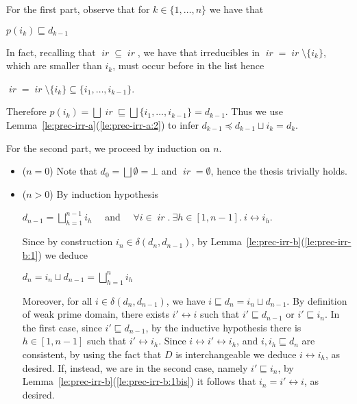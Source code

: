 \documentclass[conference]{IEEEtran}
\renewenvironment{proof}{\begin{IEEEproof}}{\end{IEEEproof}}
\newcommand{\wi}{{interchangeable}}
\newcommand{\ir}[1]{\ensuremath{\mathop{\mathit{ir}({#1})}}}
\newcommand{\diff}[2]{\ensuremath{\delta({#1},{#2})}}
\newcommand{\pred}[1]{\ensuremath{\mathit{p}({#1})}}
\newcommand{\interval}[2][1]{\ensuremath{[{#1},{#2}]}}
\begin{document}
\begin{proof}
  For the first part, observe that for $k \in \{ 1, \ldots, n\}$ we have that
  \begin{center}
    $\pred{i_k} \sqsubseteq d_{k-1}$
  \end{center}
  In fact, recalling that $\ir{i_k} \subseteq \ir{d}$, we have that
  irreducibles in $\ir{\pred{i_k}} = \ir{i_k} \setminus \{ i_k \}$, which are
  smaller than $i_k$, must occur before in the list hence
  \begin{center}
    $\ir{\pred{i_k}} = \ir{i_k} \setminus \{ i_k \} \subseteq \{ i_1, \ldots,
    i_{k-1}\}$.
  \end{center}
  Therefore
  $\pred{i_k} = \bigsqcup \ir{\pred{i_k}} \sqsubseteq \bigsqcup \{ i_1,
  \ldots, i_{k-1}\} = d_{k-1}$. Thus we use
  Lemma~\ref{le:prec-irr-a}(\ref{le:prec-irr-a:2}) to infer
  $d_{k-1} \preceq d_{k-1} \sqcup i_k = d_k$.
  
  \bigskip

  For the second part, we proceed by induction on $n$. 
  
  \begin{itemize}
  \item ($n=0$) Note that $d_0 = \bigsqcup \emptyset = \bot$ and
    $\ir{\bot} = \emptyset$, hence the thesis trivially holds.

  \item ($n>0$) By induction hypothesis
    \begin{center}
      $d_{n-1} = \bigsqcup_{h=1}^{n-1} i_h$ \ \ and \ \
    $\forall i \in \ir{d_{n-1}}.\ \exists h \in \interval{n-1}.\ i
    \leftrightarrow i_h$.
    \end{center}

    Since by construction $i_n \in \diff{d_n}{d_{n-1}}$,
    by Lemma~\ref{le:prec-irr-b}(\ref{le:prec-irr-b:1}) we deduce
    \begin{center}
      $d_n = i_n \sqcup d_{n-1} = {\bigsqcup_{h=1}^{n} i_h}$
    \end{center}
    
    Moreover, for all $i \in \diff{d_n}{d_{n-1}}$, we have $i
    \sqsubseteq d_n = i_n \sqcup
    d_{n-1}$. By definition of weak prime domain, there exists $i'
    \leftrightarrow i$ such that $i' \sqsubseteq d_{n-1}$ or $i'
    \sqsubseteq i_n$. In the first case, since $i' \sqsubseteq
    d_{n-1}$, by the inductive hypothesis there is $h \in
    \interval{n-1}$ such that $i' \leftrightarrow i_h$. Since $i
    \leftrightarrow i' \leftrightarrow i_h$, and $i, i_h \sqsubseteq
    d_n$ are consistent, by using the fact that
      $D$ is {\wi} we deduce $i \leftrightarrow
  i_h$, as desired. If, instead, we are in the second case, namely $i'
  \sqsubseteq
  i_n$, by Lemma~\ref{le:prec-irr-b}(\ref{le:prec-irr-b:1bis}) it
  follows that $i_n = i' \leftrightarrow i$, as desired.
  \end{itemize}
\end{proof}
\end{document}
